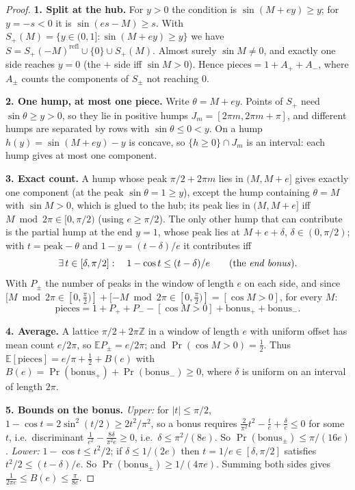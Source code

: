 \documentclass[10pt]{article}
\begin{document}
\begin{proof}
\textbf{1. Split at the hub.} For $y>0$ the condition is $\sin(M+ey)\ge y$; for $y=-s<0$ it is $\sin(es-M)\ge s$. With $S_+(M)=\{y\in(0,1]:\sin(M+ey)\ge y\}$ we have $S=S_+(-M)^{\text{refl}}\cup\{0\}\cup S_+(M)$. Almost surely $\sin M\ne0$, and exactly one side reaches $y=0$ (the $+$ side iff $\sin M>0$). Hence $\text{pieces}=1+A_++A_-$, where $A_\pm$ counts the components of $S_\pm$ not reaching $0$.

\textbf{2. One hump, at most one piece.} Write $\theta=M+ey$. Points of $S_+$ need $\sin\theta\ge y>0$, so they lie in positive humps $J_m=[2\pi m,2\pi m+\pi]$, and different humps are separated by rows with $\sin\theta\le 0<y$. On a hump $h(y)=\sin(M+ey)-y$ is concave, so $\{h\ge0\}\cap J_m$ is an interval: each hump gives at most one component.

\textbf{3. Exact count.} A hump whose peak $\pi/2+2\pi m$ lies in $(M,M+e]$ gives exactly one component (at the peak $\sin\theta=1\ge y$), except the hump containing $\theta=M$ with $\sin M>0$, which is glued to the hub; its peak lies in $(M,M+e]$ iff $M\bmod 2\pi\in[0,\pi/2)$ (using $e\ge\pi/2$). The only other hump that can contribute is the partial hump at the end $y=1$, whose peak lies at $M+e+\delta$, $\delta\in(0,\pi/2)$; with $t=\text{peak}-\theta$ and $1-y=(t-\delta)/e$ it contributes iff
\[
\exists\,t\in[\delta,\pi/2]:\quad 1-\cos t\le (t-\delta)/e \qquad(\text{the \emph{end bonus}}).
\]
With $P_\pm$ the number of peaks in the window of length $e$ on each side, and since $[M\bmod2\pi\in[0,\tfrac\pi2)]+[-M\bmod2\pi\in[0,\tfrac\pi2)]=[\cos M>0]$, for every $M$:
\[
\text{pieces}=1+P_++P_--[\cos M>0]+\text{bonus}_++\text{bonus}_-.
\]

\textbf{4. Average.} A lattice $\pi/2+2\pi\mathbb{Z}$ in a window of length $e$ with uniform offset has mean count $e/2\pi$, so $\mathbb{E}P_\pm=e/2\pi$; and $\Pr(\cos M>0)=\tfrac12$. Thus $\mathbb{E}[\text{pieces}]=e/\pi+\tfrac12+B(e)$ with $B(e)=\Pr(\text{bonus}_+)+\Pr(\text{bonus}_-)\ge0$, where $\delta$ is uniform on an interval of length $2\pi$.

\textbf{5. Bounds on the bonus.} \emph{Upper:} for $|t|\le\pi/2$, $1-\cos t=2\sin^2(t/2)\ge 2t^2/\pi^2$, so a bonus requires $\tfrac{2}{\pi^2}t^2-\tfrac{t}{e}+\tfrac{\delta}{e}\le0$ for some $t$, i.e.\ discriminant $\tfrac1{e^2}-\tfrac{8\delta}{\pi^2e}\ge0$, i.e.\ $\delta\le\pi^2/(8e)$. So $\Pr(\text{bonus}_\pm)\le\pi/(16e)$.
\emph{Lower:} $1-\cos t\le t^2/2$; if $\delta\le 1/(2e)$ then $t=1/e\in[\delta,\pi/2]$ satisfies $t^2/2\le(t-\delta)/e$. So $\Pr(\text{bonus}_\pm)\ge 1/(4\pi e)$. Summing both sides gives $\tfrac1{2\pi e}\le B(e)\le\tfrac{\pi}{8e}$.
\end{proof}
\end{document}
